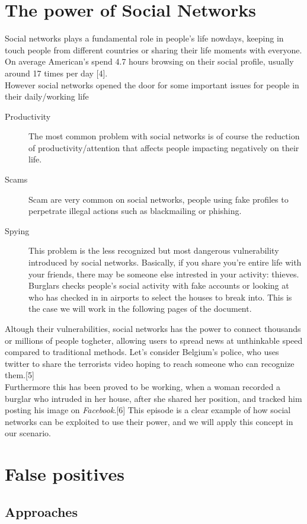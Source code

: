 \section{The power of Social Networks}

Social networks plays a fundamental role in people's life nowdays,
keeping in touch people from different countries or sharing their life
moments with everyone. On average American's spend 4.7 hours browsing on their
social profile, usually around 17 times per day [4].\\
However social networks opened the door for some important issues for people in their
daily/working life
\begin{description}
    \item[Productivity] The most common problem with social networks is of course
    the reduction of productivity/attention that affects people impacting negatively on their life.
    \item[Scams] Scam are very common on social networks, people using fake profiles to perpetrate
    illegal actions such as blackmailing or phishing.
    \item[Spying] This problem is the less recognized but most dangerous vulnerability introduced by social networks.
    Basically, if you share you're entire life with your friends, there may be someone else intrested in your activity: thieves.
    Burglars checks people's social activity with fake accounts or looking at who has checked in in airports to select the houses
    to break into. This is the case we will work in the following pages of the document.
\end{description}

Altough their vulnerabilities, social networks has the power to connect thousands or millions of people togheter,
allowing users to spread news at unthinkable speed compared to traditional methods. Let's consider
Belgium's police, who uses twitter to share the terrorists video hoping to reach someone who
can recognize them.[5] \\
Furthermore this has been proved to be working, when a woman recorded a burglar
who intruded in her house, after she shared her position, and tracked him
posting his image on \textit{Facebook}.[6] This episode is a clear example
of how social networks can be exploited to use their power, and we
will apply this concept in our scenario.

\section{False positives}

\subsection{Approaches}
